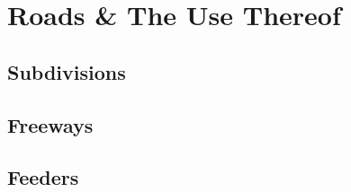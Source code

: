 \chapter{Roads \& The Use Thereof}
\minitoc
\section{Subdivisions}
\section{Freeways}
\section{Feeders}

